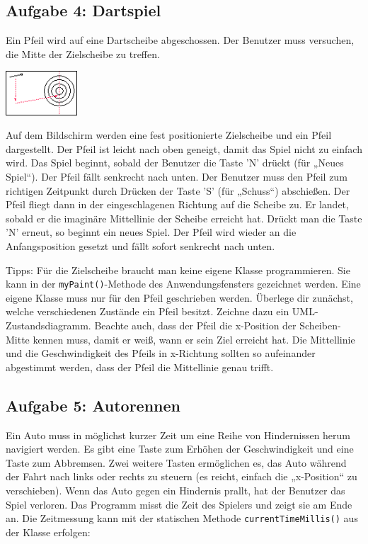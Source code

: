 \subsection{Aufgabe 4: Dartspiel}

Ein Pfeil wird auf eine Dartscheibe abgeschossen. Der Benutzer muss versuchen,
die Mitte der Zielscheibe zu treffen.

\begin{center}
\includegraphics[width=0.2\textwidth]{./inf/SEKII/21_Java_Tastaturereignisse/Dartspiel.png}
\end{center}

Auf dem Bildschirm werden eine fest positionierte Zielscheibe und ein Pfeil
dargestellt. Der Pfeil ist leicht nach oben geneigt, damit das Spiel nicht zu
einfach wird. Das Spiel beginnt, sobald der Benutzer die Taste ’N’ drückt (für
„Neues Spiel“). Der Pfeil fällt senkrecht nach unten. Der Benutzer muss den
Pfeil zum richtigen Zeitpunkt durch Drücken der Taste ’S’ (für „Schuss“)
abschießen. Der Pfeil fliegt dann in der eingeschlagenen Richtung auf die
Scheibe zu. Er landet, sobald er die imaginäre Mittellinie der Scheibe erreicht
hat. Drückt man die Taste ’N’ erneut, so beginnt ein neues Spiel. Der Pfeil
wird wieder an die Anfangsposition gesetzt und fällt sofort senkrecht nach unten.

Tipps: Für die Zielscheibe braucht man keine eigene Klasse programmieren. Sie
kann in der \lstinline|myPaint()|-Methode des Anwendungsfensters gezeichnet
werden. Eine eigene Klasse muss nur für den Pfeil geschrieben werden. Überlege
dir zunächst, welche verschiedenen Zustände ein Pfeil besitzt. Zeichne dazu ein
UML-Zustandsdiagramm. Beachte auch, dass der Pfeil die x-Position der
Scheiben-Mitte kennen muss, damit er weiß, wann er sein Ziel erreicht hat. Die
Mittellinie und die Geschwindigkeit des Pfeils in x-Richtung sollten so
aufeinander abgestimmt werden, dass der Pfeil die Mittellinie genau trifft.


\subsection{Aufgabe 5: Autorennen}

Ein Auto muss in möglichst kurzer Zeit um eine Reihe von Hindernissen herum
navigiert werden. Es gibt eine Taste zum Erhöhen der Geschwindigkeit und eine
Taste zum Abbremsen. Zwei weitere Tasten ermöglichen es, das Auto während der
Fahrt nach links oder rechts zu steuern (es reicht, einfach die „x-Position“ zu
verschieben). Wenn das Auto gegen ein Hindernis prallt, hat der Benutzer das
Spiel verloren. Das Programm misst die Zeit des Spielers und zeigt sie am Ende
an. Die Zeitmessung kann mit der statischen Methode
\lstinline|currentTimeMillis()| aus der Klasse  erfolgen:

